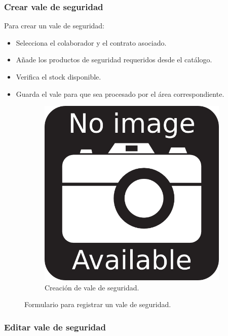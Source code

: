 \subsubsection{Crear vale de seguridad}

Para crear un vale de seguridad:

\begin{itemize}
    \item Selecciona el colaborador y el contrato asociado.
    \item Añade los productos de seguridad requeridos desde el catálogo.
    \item Verifica el stock disponible.
    \item Guarda el vale para que sea procesado por el área correspondiente.
\end{itemize}

\begin{figure}[h]
\centering
\begin{subfigure}{0.4\textwidth}
    \includegraphics[width=\textwidth]{imgs/no-image.png}
    \caption{Creación de vale de seguridad.}
    \label{fig:operaciones2}
\end{subfigure}
\caption{Formulario para registrar un vale de seguridad.}
\end{figure}

\subsubsection{Editar vale de seguridad}

